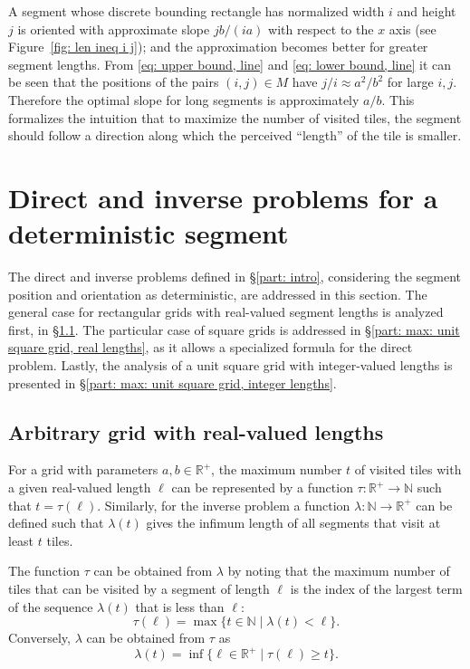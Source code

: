 \documentclass[12pt, a4paper]{article}
\newcommand{\st}{\mid}%
\newcommand{\funt}{\tau} %
\newcommand{\funl}{\lambda} %
\newcommand{\len}{\ell} %
\newcommand{\tiles}{t} %
\newcommand{\mss}{M}
\begin{document}
A segment whose discrete bounding rectangle has normalized width $i$ and height $j$ is oriented with approximate slope $jb/(ia)$ with respect to the $x$ axis (see Figure~\ref{fig: len ineq i j}); and the approximation becomes better for greater segment lengths. From \eqref{eq: upper bound, line} and \eqref{eq: lower bound, line} it can be seen that the positions of the pairs $(i,j) \in \mss$ have $j/i \approx a^2/b^2$ for large $i, j$. Therefore the optimal slope for long segments is approximately $a/b$. This formalizes the intuition that to maximize the number of visited tiles, the segment should follow a direction along which the perceived ``length'' of the tile is smaller.


\section{Direct and inverse problems for a deterministic segment}
\label{part: max}

The direct and inverse problems defined in \S\ref{part: intro}, considering the segment position and orientation as deterministic, are addressed in this section. The general case for rectangular grids with real-valued segment lengths is analyzed first, in \S\ref{part: max: arbitrary grid, real lengths}. The particular case of square grids is addressed in \S\ref{part: max: unit square grid, real lengths}, as it allows a specialized formula for the direct problem. Lastly, the analysis of a unit square grid with integer-valued lengths is presented in \S\ref{part: max: unit square grid, integer lengths}.


\subsection{Arbitrary grid with real-valued lengths}
\label{part: max: arbitrary grid, real lengths}

For a grid with parameters $a, b \in \mathbb R^+$, the maximum number $\tiles$ of visited tiles with a given real-valued length $\len$ can be represented by a function $\funt: \mathbb R^+ \to \mathbb N$ such that $\tiles = \funt(\len)$. Similarly, for the inverse problem a function $\funl: \mathbb N \to \mathbb R^+$ can be defined such that $\funl(\tiles)$ gives the infimum length of all segments that visit at least $\tiles$ tiles.

The function $\funt$ can be obtained from $\funl$ by noting that the maximum number of tiles that can be visited by a segment of length $\len$ is the index of the largest term of the sequence $\funl(\tiles)$ that is less than $\len$:
\begin{equation}
\label{eq: funt funl}
\funt(\len) = \max \{\tiles \in \mathbb N \st \funl(\tiles)<\len\}.
\end{equation}
Conversely, $\funl$ can be obtained from $\funt$ as
\begin{equation}
\label{eq: funl funt}
\funl(\tiles) = \inf\{\len \in \mathbb R^+ \st \funt(\len) \geq \tiles\}.
\end{equation}
\end{document}
